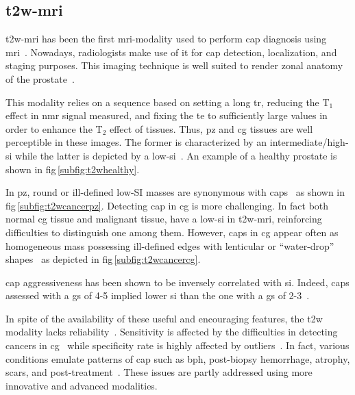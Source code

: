 \subsection{\acs*{t2w}-\acs*{mri}}\label{subsec:chp2:imaging:t2w}
\ac{t2w}-\ac{mri} has been the first \ac{mri}-modality used to perform \ac{cap}
diagnosis using \ac{mri}~\cite{Hricak1983}.
Nowadays, radiologists make use of it for \ac{cap} detection, localization, and
staging purposes.
This imaging technique is well suited to render zonal anatomy of the
prostate~\cite{Barentsz2012}.

This modality relies on a sequence based on setting a long \ac{tr}, reducing
the T$_{1}$ effect in \ac{nmr} signal measured, and fixing the \ac{te} to
sufficiently large values in order to enhance the T$_{2}$ effect of tissues.
Thus, \ac{pz} and \ac{cg} tissues are well perceptible in these images.
The former is characterized by an intermediate/high-\ac{si} while the latter is
depicted by a low-\ac{si}~\cite{Hricak1987}.
An example of a healthy prostate is shown in \acs{fig}\,\ref{subfig:t2whealthy}.

In \ac{pz}, round or ill-defined low-SI masses are synonymous with
\acp{cap}~\cite{Hricak1983} as shown in \acs{fig}\,\ref{subfig:t2wcancerpz}.
Detecting \ac{cap} in \ac{cg} is more challenging.
In fact both normal \ac{cg} tissue and malignant tissue, have a low-\ac{si} in
\ac{t2w}-\ac{mri}, reinforcing difficulties to distinguish one among them.
However, \acp{cap} in \ac{cg} appear often as homogeneous mass possessing
ill-defined edges with lenticular or ``water-drop''
shapes~\cite{Akin2006,Barentsz2012} as depicted in
\acs{fig}\,\ref{subfig:t2wcancercg}.

\ac{cap} aggressiveness has been shown to be inversely correlated with \ac{si}.
Indeed, \acp{cap} assessed with a \ac{gs} of 4-5 implied lower \ac{si} than the
one with a \ac{gs} of 2-3~\cite{Wang2008}.

In spite of the availability of these useful and encouraging features, the
\ac{t2w} modality lacks reliability~\cite{Kirkham2006,Hoeks2011}.
Sensitivity is affected by the difficulties in detecting cancers in
\ac{cg}~\cite{Kirkham2006} while specificity rate is highly affected by
outliers~\cite{Barentsz2012}.
In fact, various conditions emulate patterns of \ac{cap} such as \ac{bph},
post-biopsy hemorrhage, atrophy, scars, and
post-treatment~\cite{Hricak1987,Quint1991,Scheidler1999,Cruz2002,Barentsz2012}.
These issues are partly addressed using more innovative and advanced modalities.

